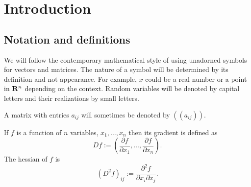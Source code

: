 \chapter{Introduction}\label{c1}
\section{Notation and definitions}\label{c1s1}
We will follow the contemporary mathematical style of using unadorned symbols for vectors and
matrices. The nature of a symbol will be determined by its definition and not appearance. For
example, $x$ could be a real number or a point in $\mathbf{R}^n$ depending on the context. Random
variables will be denoted by capital letters and their realizations by small letters.

A matrix with entries $a_{ij}$ will sometimes be denoted by $((a_{ij}))$.

If $f$ is a function of $n$ variables, $x_1, \ldots, x_n$ then its gradient is defined as
\begin{equation}\label{c1s1e1}
Df := \left(\frac{\partial f}{\partial x_1}, \ldots, \frac{\partial f}{\partial x_n}\right).
\end{equation}
The hessian of $f$ is
\begin{equation}\label{c1s1e2}
(D^2 f)_{ij} := \frac{\partial^2 f}{\partial x_i \partial x_j}.
\end{equation}

